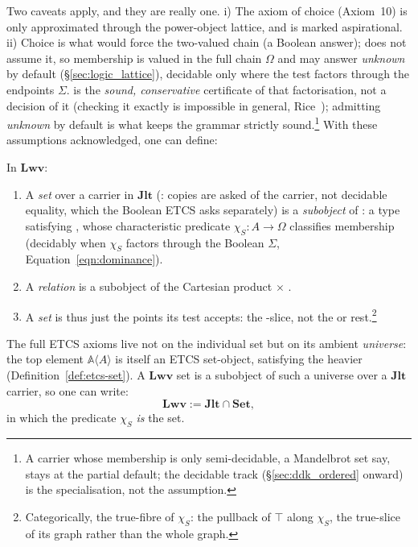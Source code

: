 \documentclass[11pt, a4paper]{article}
\begin{document}
Two caveats apply, and they are really one.
i) The axiom of choice (Axiom~10) is only approximated through the power-object lattice, and is marked aspirational.
ii) Choice is what would force the two-valued chain (a Boolean answer);  does not assume it, so membership is valued in the full chain $\Omega$ and may answer \emph{unknown} by default (§\ref{sec:logic_lattice}), decidable only where the test factors through the endpoints $\Sigma$.
 is the \emph{sound, conservative} certificate of that factorisation, not a decision of it (checking it exactly is impossible in general, Rice~\cite{rice1953classes}); admitting \emph{unknown} by default is what keeps the grammar strictly sound.\footnote{A carrier whose membership is only semi-decidable, a Mandelbrot set say, stays at the partial default; the decidable track (§\ref{sec:ddk_ordered} onward) is the specialisation, not the assumption.}
With these assumptions acknowledged, one can define:
\begin{definition}[$\mathbf{Lwv} := \mathbf{Jlt} \cap \mathbf{Set}$]
\label{def:lwv-set}
In $\mathbf{Lwv}$:
\begin{enumerate}
\item A \emph{set} over a carrier  in $\mathbf{Jlt}$ (: copies are asked of the carrier, not decidable equality, which the Boolean ETCS  asks separately) is a \emph{subobject} of : a type  satisfying , whose characteristic predicate $\chi_S : A \to \Omega$ classifies membership (decidably when $\chi_S$ factors through the Boolean $\Sigma$, Equation~\ref{eqn:dominance}).
\item A \emph{relation} is a subobject of the Cartesian product  $\times$ .
\item A \emph{set} is thus just the points its test accepts: the -slice, not the  or  rest.\footnote{Categorically, the true-fibre of $\chi_S$: the pullback of $\top$ along $\chi_S$, the true-slice of its graph rather than the whole graph.}
\end{enumerate}
The full ETCS axioms live not on the individual set but on its ambient \emph{universe}: the top element $\mathbb{A}\langle A\rangle$ is itself an ETCS set-object, satisfying the heavier  (Definition~\ref{def:etcs-set}).
A $\mathbf{Lwv}$ set is a subobject of such a universe over a $\mathbf{Jlt}$ carrier, so one can write:
\begin{equation}
\label{eqn:lwv}
\mathbf{Lwv} := \mathbf{Jlt} \cap \mathbf{Set},
\end{equation}
in which the predicate $\chi_S$ \emph{is} the set.
\end{definition}
\end{document}

